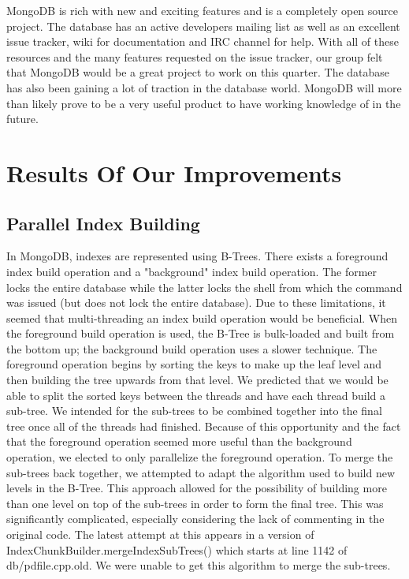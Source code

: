 \documentclass{../dependencies/acm_proc_article-sp}
\begin{document}
MongoDB is rich with new and exciting features and is a completely open source project.
The database has an active developers mailing list as well as an excellent issue tracker,
wiki for documentation and IRC channel for help. With all of these resources and
the many features requested on the issue tracker, our group felt that MongoDB would be a great
project to work on this quarter. The database has also been gaining a lot of traction in the
database world. MongoDB will more than likely prove to be a very useful product
to have working knowledge of in the future.

\section{Results Of Our Improvements}
\subsection{Parallel Index Building}
In MongoDB, indexes are represented using B-Trees.
There exists a foreground index build operation and a "background" index build operation.
The former locks the entire database while the latter locks the shell from which the command was issued (but does not lock the entire database).
Due to these limitations, it seemed that multi-threading an index build operation would be beneficial.
When the foreground build operation is used, the B-Tree is bulk-loaded and built from the bottom up; the background build operation uses a slower technique\cite{1}.
The foreground operation begins by sorting the keys to make up the leaf level and then building the tree upwards from that level.
We predicted that we would be able to split the sorted keys between the threads and have each thread build a sub-tree.
We intended for the sub-trees to be combined together into the final tree once all of the threads had finished.
Because of this opportunity and the fact that the foreground operation seemed more useful than the background operation, we elected to only parallelize the foreground operation.
To merge the sub-trees back together, we attempted to adapt the algorithm used to build new levels in the B-Tree.
This approach allowed for the possibility of building more than one level on top of the sub-trees in order to form the final tree.
This was significantly complicated, especially considering the lack of commenting in the original code.
The latest attempt at this appears in a version of IndexChunkBuilder.mergeIndexSubTrees() which starts at line 1142 of db/pdfile.cpp.old.
We were unable to get this algorithm to merge the sub-trees.
\end{document}
